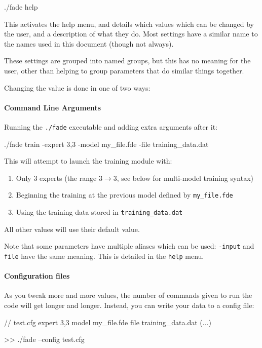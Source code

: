 		\begin{terminal}
			./fade help
		\end{terminal}

		This activates the help menu, and details which values which can be changed by the user, and a description of what they do. Most settings have a similar name to the names used in this document (though not always).

		These settings are grouped into named groups, but this has no meaning for the user, other than helping to group parameters that do similar things together.

		Changing the value is done in one of two ways:

		\paragraph{Command Line Arguments} Running the \texttt{./fade} executable and adding extra arguments after it:

		\begin{terminal}
./fade train -expert 3,3 -model my_file.fde -file training_data.dat
		\end{terminal}
		This will attempt to launch the training module with:
		\begin{enumerate}
			\item Only 3 experts (the range $3 \to 3$, see below for multi-model training syntax)
			\item Beginning the training at the previous model defined by \texttt{my\_file.fde}
			\item Using the training data stored in \texttt{training\_data.dat}
		\end{enumerate}
		All other values will use their default value.

		Note that some parameters have multiple aliases which can be used: \texttt{-input} and \texttt{file} have the same meaning. This is detailed in the \texttt{help} menu.

		\paragraph{Configuration files} As you tweak more and more values, the number of commands given to run the code will get longer and longer. Instead, you can write your data to a config file:

		\begin{terminal}
// test.cfg
expert 3,3
model my_file.fde
file training_data.dat
(...)

>> ./fade --config test.cfg
		\end{terminal}

